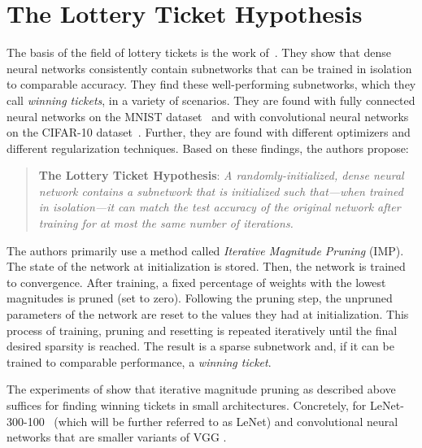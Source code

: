 \section{The Lottery Ticket Hypothesis}\label{sec:lth}
The basis of the field of lottery tickets is the work of~\cite{LTH}. 
They show that dense neural networks consistently contain subnetworks that can be trained in isolation to comparable accuracy.
They find these well-performing subnetworks, which they call \textit{winning tickets}, in a variety of scenarios.
They are found with fully connected neural networks on the MNIST dataset~\autocite{mnist} and with convolutional neural networks~\autocite{cnn} on the CIFAR-10 dataset~\autocite{cifar}.
Further, they are found with different optimizers and different regularization techniques.
Based on these findings, the authors propose:

\begin{quote}
\textbf{The Lottery Ticket Hypothesis}: \textit{A randomly-initialized, dense neural network contains a subnetwork that is initialized such that—when trained in isolation—it can match the test accuracy of the original network after training for at most the same number of iterations.}~\cite{LTH}
\end{quote}

The authors primarily use a method called \textit{Iterative Magnitude Pruning} ({IMP}).
The state of the network at initialization is stored.
Then, the network is trained to convergence. 
After training, a fixed percentage of weights with the lowest magnitudes is pruned (set to zero).
Following the pruning step, the unpruned parameters of the network are reset to the values they had at initialization.
This process of training, pruning and resetting is repeated iteratively until the final desired sparsity is reached.
The result is a sparse subnetwork and, if it can be trained to comparable performance,  a \textit{winning ticket}.

The experiments of \autocite{LTH} show that iterative magnitude pruning as described above suffices for finding winning tickets in small architectures.
Concretely, for LeNet-{300}-{100}~\autocite{cnn} (which will be further referred to as LeNet) and convolutional neural networks that are smaller variants of VGG \autocite{SimonyanZisserman}.

